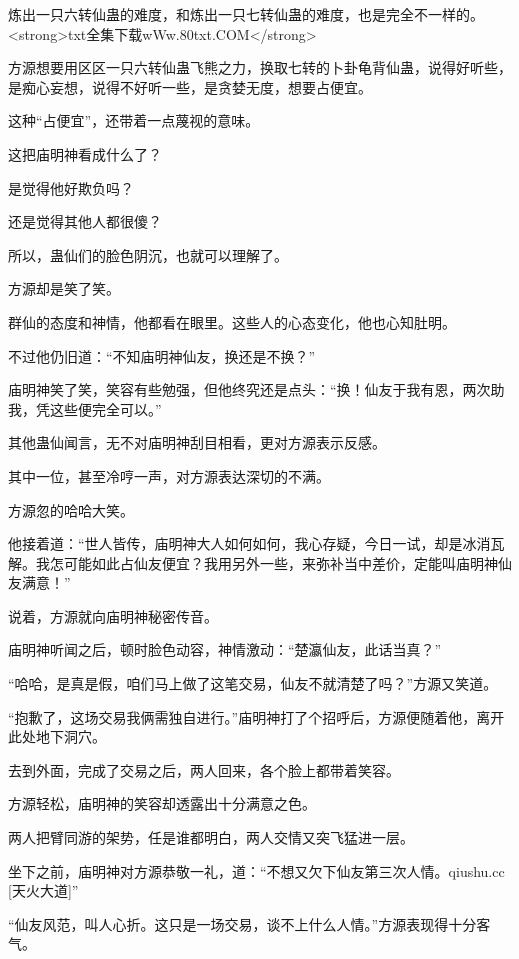 
\begin{this_body}

炼出一只六转仙蛊的难度，和炼出一只七转仙蛊的难度，也是完全不一样的。<strong>txt全集下载wWw.80txt.COM</strong>

方源想要用区区一只六转仙蛊飞熊之力，换取七转的卜卦龟背仙蛊，说得好听些，是痴心妄想，说得不好听一些，是贪婪无度，想要占便宜。

这种“占便宜”，还带着一点蔑视的意味。

这把庙明神看成什么了？

是觉得他好欺负吗？

还是觉得其他人都很傻？

所以，蛊仙们的脸色阴沉，也就可以理解了。

方源却是笑了笑。

群仙的态度和神情，他都看在眼里。这些人的心态变化，他也心知肚明。

不过他仍旧道：“不知庙明神仙友，换还是不换？”

庙明神笑了笑，笑容有些勉强，但他终究还是点头：“换！仙友于我有恩，两次助我，凭这些便完全可以。”

其他蛊仙闻言，无不对庙明神刮目相看，更对方源表示反感。

其中一位，甚至冷哼一声，对方源表达深切的不满。

方源忽的哈哈大笑。

他接着道：“世人皆传，庙明神大人如何如何，我心存疑，今日一试，却是冰消瓦解。我怎可能如此占仙友便宜？我用另外一些，来弥补当中差价，定能叫庙明神仙友满意！”

说着，方源就向庙明神秘密传音。

庙明神听闻之后，顿时脸色动容，神情激动：“楚瀛仙友，此话当真？”

“哈哈，是真是假，咱们马上做了这笔交易，仙友不就清楚了吗？”方源又笑道。

“抱歉了，这场交易我俩需独自进行。”庙明神打了个招呼后，方源便随着他，离开此处地下洞穴。

去到外面，完成了交易之后，两人回来，各个脸上都带着笑容。

方源轻松，庙明神的笑容却透露出十分满意之色。

两人把臂同游的架势，任是谁都明白，两人交情又突飞猛进一层。

坐下之前，庙明神对方源恭敬一礼，道：“不想又欠下仙友第三次人情。qiushu.cc [天火大道]”

“仙友风范，叫人心折。这只是一场交易，谈不上什么人情。”方源表现得十分客气。


\end{this_body}
